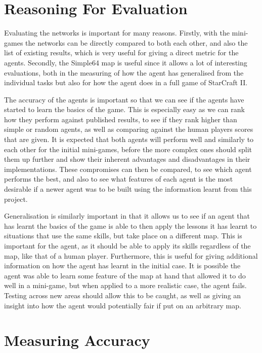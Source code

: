 \section{Reasoning For Evaluation}

Evaluating the networks is important for many reasons. Firstly, with the
mini-games the networks can be directly compared to both each other, and also
the list of existing results, which is very useful for giving a direct metric
for the agents. Secondly, the Simple64 map is useful since it allows a lot of
interesting evaluations, both in the measuring of how the agent has generalised
from the individual tasks but also for how the agent does in a full game of
StarCraft II\@.

The accuracy of the agents is important so that we can see if the agents have
started to learn the basics of the game. This is especially easy as we can rank
how they perform against published results, to see if they rank higher than
simple or random agents, as well as comparing against the human players scores
that are given. It is expected that both agents will perform well and similarly
to each other for the initial mini-games, before the more complex ones should
split them up further and show their inherent advantages and disadvantages in
their implementations. These compromises can then be compared, to see which
agent performs the best, and also to see what features of each agent is the most
desirable if a newer agent was to be built using the information learnt from
this project.

Generalisation is similarly important in that it allows us to see if an agent
that has learnt the basics of the game is able to then apply the lessons it has
learnt to situations that use the same skills, but take place on a different
map. This is important for the agent, as it should be able to apply its skills
regardless of the map, like that of a human player. Furthermore, this is useful
for giving additional information on how the agent has learnt in the initial
case. It is possible the agent was able to learn some feature of the map at hand
that allowed it to do well in a mini-game, but when applied to a more realistic
case, the agent fails. Testing across new areas should allow this to be caught,
as well as giving an insight into how the agent would potentially fair if put on
an arbitrary map.

\section{Measuring Accuracy}

